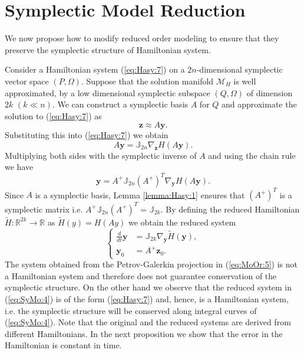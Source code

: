 \section{Symplectic Model Reduction} \label{chap:SyMo:1}
We now propose how to modify reduced order modeling to ensure that they preserve the symplectic structure of Hamiltonian system. 



Consider a Hamiltonian system (\ref{eq:Hasy:7}) on a $2n$-dimensional symplectic vector space $(P,\Omega)$. Suppose that the solution manifold $\mathcal M_H$ is well approximated, by a low dimensional symplectic subspace $(Q,\Omega)$ of dimension $2k$ $(k\ll n)$. We can construct a symplectic basis $A$ for $Q$ and approximate the solution to (\ref{eq:Hasy:7}) as
\begin{equation} \label{eq:SyMo:1}
	\mathbf z \approx A\mathbf y.
\end{equation}
Substituting this into (\ref{eq:Hasy:7}) we obtain
\begin{equation} \label{eq:SyMo:2}
	A\mathbf y = \mathbb{J}_{2n} \nabla_{\mathbf z} H(A \mathbf y). 
\end{equation}
Multiplying both sides with the symplectic inverse of $A$ and using the chain rule we have
\begin{equation} \label{eq:SyMo:3}
	\mathbf y = A^+ \mathbb J_{2n} (A^+)^T \nabla_{\mathbf y} H(A\mathbf y).
\end{equation}
Since $A$ is a symplectic basis, Lemma \ref{lemma:Hasy:1} ensures that $(A^+)^T$ is a symplectic matrix i.e. $A^+ \mathbb J_{2n} (A^+)^T = \mathbb{J}_{2k}$. By defining the reduced Hamiltonian $\tilde H:\mathbb R^{2k} \to \mathbb R$ as $\tilde H (y) = H(Ay)$ we obtain the reduced system
\begin{equation} \label{eq:SyMo:4}
\left\{
\begin{aligned}
	 \frac{d}{dt} \mathbf y &= \mathbb J_{2k} \nabla_{\mathbf y} \tilde H(\mathbf y), \\
	 \mathbf y_0 &= A^+ \mathbf z_0.
\end{aligned}
\right.
\end{equation}
The system obtained from the Petrov-Galerkin projection in (\ref{eq:MoOr:5}) is not a Hamiltonian system and therefore does not guarantee conservation of the symplectic structure. On the other hand we observe that the reduced system in (\ref{eq:SyMo:4}) is of the form (\ref{eq:Hasy:7}) and, hence, is a Hamiltonian system, i.e. the symplectic structure will be conserved along integral curves of (\ref{eq:SyMo:4}). Note that the original and the reduced systems are derived from different Hamiltonians. In the next proposition we show that the error in the Hamiltonian is constant in time. 


